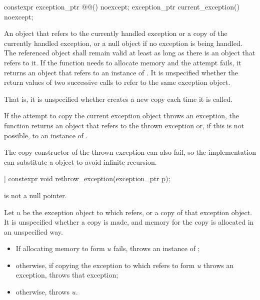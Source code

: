 %
\begin{itemdecl}
constexpr exception_ptr @@() noexcept;
exception_ptr current_exception() noexcept;
\end{itemdecl}

\begin{itemdescr}
\pnum
\returns
An  object that refers to
the currently handled exception or a copy of the currently
handled exception, or a null  object if no exception is being
handled. The referenced object shall remain valid at least as long as there is an
 object that refers to it.
If the function needs to allocate memory and the attempt fails, it returns an
 object that refers to an instance of .
It is unspecified whether the return values of two successive calls to
 refer to the same exception object.
\begin{note}
That is, it is unspecified whether 
creates a new copy each time it is called.
\end{note}
If the attempt to copy the current exception object throws an exception, the function
returns an  object that refers to the thrown exception or,
if this is not possible, to an instance of .
\begin{note}
The copy constructor of the thrown exception can also fail,
so the implementation can substitute a  object
to avoid infinite recursion.
\end{note}
\end{itemdescr}

%
\begin{itemdecl}
[[noreturn]] constexpr void rethrow_exception(exception_ptr p);
\end{itemdecl}

\begin{itemdescr}
\pnum
\expects
{} is not a null pointer.

\pnum
\effects
Let $u$ be the exception object to which  refers, or
a copy of that exception object.
It is unspecified whether a copy is made, and
memory for the copy is allocated in an unspecified way.
\begin{itemize}
\item
If allocating memory to form $u$ fails,
throws an instance of ;
\item
otherwise, if copying the exception to which  refers
to form $u$ throws an exception, throws that exception;
\item
otherwise, throws $u$.
\end{itemize}
\end{itemdescr}

